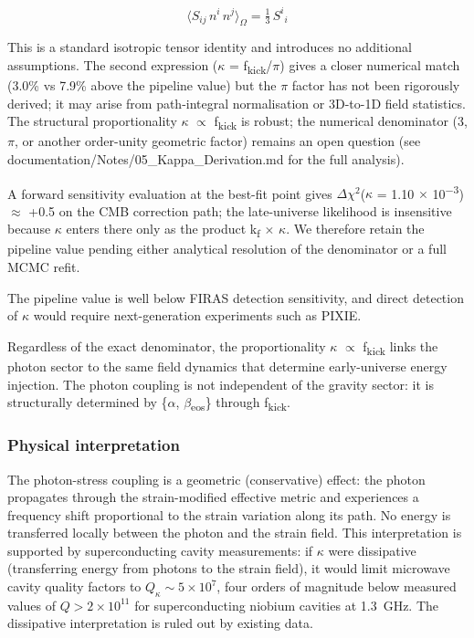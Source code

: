 \documentclass[11pt,a4paper]{article}
\begin{document}
$$
\langle S_{ij}\,n^i\,n^j \rangle_{\Omega} = \tfrac{1}{3}\,S^i{}_i
$$

This is a standard isotropic tensor identity and introduces no additional assumptions. The second expression ($\kappa$ = f\textsubscript{kick}/$\pi$) gives a closer numerical match (3.0\% vs 7.9\% above the pipeline value) but the $\pi$ factor has not been rigorously derived; it may arise from path-integral normalisation or 3D-to-1D field statistics. The structural proportionality $\kappa$ $\propto$ f\textsubscript{kick} is robust; the numerical denominator (3, $\pi$, or another order-unity geometric factor) remains an open question (see documentation/\allowbreak{}Notes/\allowbreak{}05\_\allowbreak{}Kappa\_\allowbreak{}Derivation.md for the full analysis).

A forward sensitivity evaluation at the best-fit point gives $\Delta$$\chi$$^{2}$($\kappa$ = 1.10 $\times$ 10\textsuperscript{$-$3}) $\approx$ +0.5 on the CMB correction path; the late-universe likelihood is insensitive because $\kappa$ enters there only as the product k\textsubscript{f} $\times$ $\kappa$. We therefore retain the pipeline value pending either analytical resolution of the denominator or a full MCMC refit.

The pipeline value is well below FIRAS detection sensitivity, and direct detection of $\kappa$ would require next-generation experiments such as PIXIE.

Regardless of the exact denominator, the proportionality $\kappa$ $\propto$ f\textsubscript{kick} links the photon sector to the same field dynamics that determine early-universe energy injection. The photon coupling is not independent of the gravity sector: it is structurally determined by \{$\alpha$, $\beta$\textsubscript{eos}\} through f\textsubscript{kick}.

\subsubsection{Physical interpretation}
The photon-stress coupling is a geometric (conservative) effect: the photon propagates through the strain-modified effective metric and experiences a frequency shift proportional to the strain variation along its path. No energy is transferred locally between the photon and the strain field. This interpretation is supported by superconducting cavity measurements: if \(\kappa\) were dissipative (transferring energy from photons to the strain field), it would limit microwave cavity quality factors to \(Q_\kappa \sim 5 \times 10^7\), four orders of magnitude below measured values of \(Q > 2 \times 10^{11}\) for superconducting niobium cavities at 1.3~GHz. The dissipative interpretation is ruled out by existing data.
\end{document}
